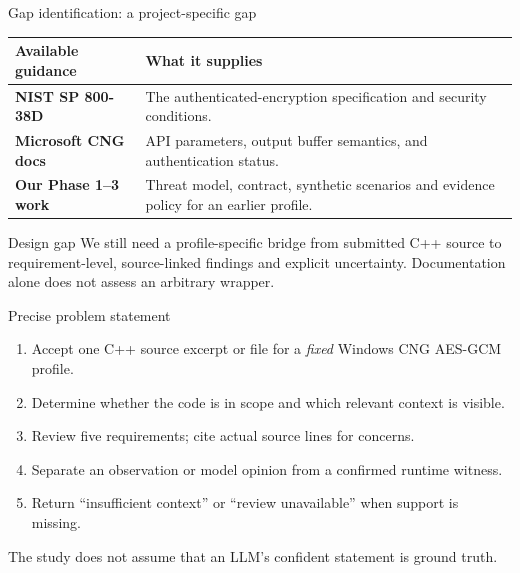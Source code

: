 \documentclass[aspectratio=169,10pt]{beamer}
\begin{document}
\begin{frame}{Gap identification: a project-specific gap}
\begin{tabularx}{\textwidth}{>{\bfseries}p{2.5cm}X}
\toprule
Available guidance & What it supplies \\
\midrule
NIST SP 800-38D & The authenticated-encryption specification and security conditions. \\
Microsoft CNG docs & API parameters, output buffer semantics, and authentication status. \\
Our Phase 1--3 work & Threat model, contract, synthetic scenarios and evidence policy for an earlier profile. \\
\bottomrule
\end{tabularx}
\vspace{1em}
\begin{block}{Design gap}
We still need a profile-specific bridge from submitted C++ source to requirement-level, source-linked findings and explicit uncertainty. Documentation alone does not assess an arbitrary wrapper.
\end{block}
\end{frame}

\begin{frame}{Precise problem statement}
\begin{enumerate}
\item Accept one C++ source excerpt or file for a \emph{fixed} Windows CNG AES-GCM profile.
\item Determine whether the code is in scope and which relevant context is visible.
\item Review five requirements; cite actual source lines for concerns.
\item Separate an observation or model opinion from a confirmed runtime witness.
\item Return ``insufficient context'' or ``review unavailable'' when support is missing.
\end{enumerate}
\vspace{0.4em}
\alert{The study does not assume that an LLM's confident statement is ground truth.}
\end{frame}
\end{document}
